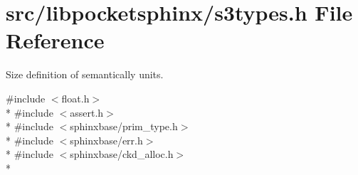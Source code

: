 \section{src/libpocketsphinx/s3types.h File Reference}
\label{s3types_8h}


Size definition of semantically units.  


{\ttfamily \#include $<$float.\-h$>$}\\*
{\ttfamily \#include $<$assert.\-h$>$}\\*
{\ttfamily \#include $<$sphinxbase/prim\-\_\-type.\-h$>$}\\*
{\ttfamily \#include $<$sphinxbase/err.\-h$>$}\\*
{\ttfamily \#include $<$sphinxbase/ckd\-\_\-alloc.\-h$>$}\\*
